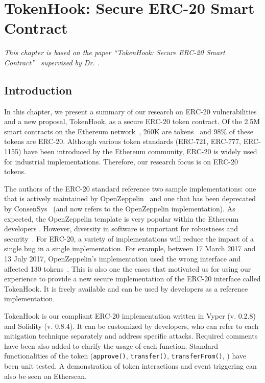 
\chapter{TokenHook: Secure ERC-20 Smart Contract}\label{ch:tokenhook}

\textit{This chapter is based on the paper ``TokenHook: Secure ERC-20 Smart Contract''~\cite{token2021} supervised by Dr. \supv.}
	
\section{Introduction}
In this chapter, we present a summary of our research on ERC-20 vulnerabilities and a new proposal, TokenHook, as a secure ERC-20 token contract. Of the 2.5M smart contracts on the Ethereum network~\cite{Alethio}, 260K are tokens~\cite{TokenTracker} and 98\% of these tokens are ERC-20. Although various token standards (\eg ERC-721, ERC-777, ERC-1155) have been introduced by the Ethereum community, ERC-20 is widely used for industrial implementations. Therefore, our research focus is on ERC-20 tokens.

The authors of the ERC-20 standard reference two sample implementations: one that is actively maintained by OpenZeppelin~\cite{OpenZeppelin_Token} and one that has been deprecated by ConsenSys~\cite{ConsenSys_Token} (and now refers to the OpenZeppelin implementation). As expected, the OpenZeppelin template is very popular within the Ethereum developers \cite{OpenZeppelin1,OpenZeppelin2,OpenZeppelin3}. However, diversity in software is important for robustness and security~\cite{FSA97,FHS97}. For ERC-20, a variety of implementations will reduce the impact of a single bug in a single implementation. For example, between 17 March 2017 and 13 July 2017, OpenZeppelin's implementation used the wrong interface and affected 130 tokens~\cite{TokenBug}. This is also one the cases that motivated us for using our experience to provide a new secure implementation of the ERC-20 interface called TokenHook. It is freely available and can be used by developers as a reference implementation.

TokenHook is our compliant ERC-20 implementation written in Vyper (v. 0.2.8) and Solidity (v. 0.8.4). It can be customized by developers, who can refer to each mitigation technique separately and address specific attacks. Required comments have been also added to clarify the usage of each function. Standard functionalities of the token (\ie \texttt{approve()}, \texttt{transfer()}, \texttt{transferFrom()}, \etc) have been unit tested. A demonstration of token interactions and event triggering can also be seen on Etherscan. 

